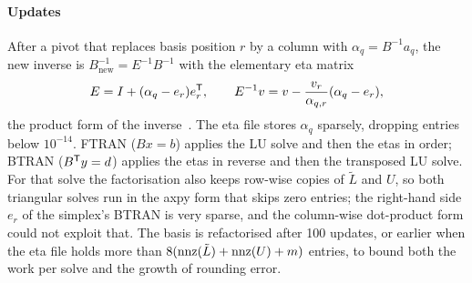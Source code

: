 \paragraph{Updates}
After a pivot that replaces basis position $r$ by a column with $\alpha_q=B^{-1}a_q$, the new inverse
is $B_{\text{new}}^{-1}=E^{-1}B^{-1}$ with the elementary eta matrix
\begin{equation}\label{eq:eta}
  E = I + (\alpha_q - e_r)e_r^{\mathsf{T}},\qquad
  E^{-1}v = v - \frac{v_r}{\alpha_{q,r}}(\alpha_q - e_r) ,
\end{equation}
the product form of the inverse~\cite{dantzig1954}. The eta file stores $\alpha_q$ sparsely,
dropping entries below $10^{-14}$. FTRAN ($B x = b$) applies the LU solve and then the etas in order;
BTRAN ($B^{\mathsf{T}} y=d$) applies the etas in reverse and then the transposed LU solve. For that
solve the factorisation also keeps row-wise copies of $\tilde L$ and $U$, so both triangular solves
run in the axpy form that skips zero entries; the right-hand side $e_r$ of the simplex's BTRAN
is very sparse, and the column-wise dot-product form could not exploit that. The basis is
refactorised after 100 updates, or earlier when the eta file holds more than
$8(\operatorname{nnz}(\tilde L)+\operatorname{nnz}(U)+m)$ entries, to bound both the work per solve and the growth of rounding
error.

\begin{algorithm}[t]
\caption{Left-looking sparse LU with threshold pivoting and repair ()}\label{alg:lu}
\end{algorithm}

